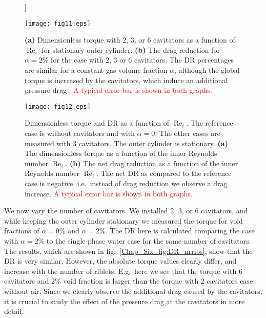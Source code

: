 \documentclass[aps,onecolumn,10pt, floatfix, superscriptaddress,longbibliography, pra]{revtex4-1}
\newcommand{\red}[1]{\textcolor{red}{#1}}
\renewcommand{\Re}{\operatorname{Re}}
\begin{document}
\begin{figure}[htp]
\centering]


\texttt{[image: fig11.eps]}
\caption{{\bf (a)} Dimensionless torque with 2, 3, or 6 cavitators as a function of $\Re_i$ for stationary outer cylinder. {\bf (b)} The drag reduction for $\alpha=2\%$ for the case with 2, 3 or 6 cavitators. The DR percentages are similar for a constant gas volume fraction $\alpha$, although the global torque is increased by the cavitators, which induce an additional pressure drag \citep{zhu18}. \red{A typical error bar is shown in both graphs.} }
\label{Chap_Six_fig:DR_nrribs}

\texttt{[image: fig12.eps]}
\caption{Dimensionless torque and DR as a function of $\Re_i$. The reference case is without cavitators and with $\alpha=0$. The other cases are measured with 3 cavitators. The outer cylinder is stationary. {\bf (a)} The dimensionless torque as a function of the inner Reynolds number $\Re_i$. {\bf (b)} The net drag reduction as a function of the inner Reynolds number $\Re_i$. The net DR as compared to the reference case is negative, i.e.\ instead of drag reduction we observe a drag increase. \red{A typical error bar is shown in both graphs.}}
\label{Chap_Six_fig:DR_net}
\end{figure} 

We now vary the number of cavitators. We installed 2, 3, or 6 cavitators, and while keeping the outer cylinder stationary we measured the torque for void fractions of $\alpha=0\%$ and $\alpha=2\%$. The DR here is calculated comparing the case with $\alpha=2\%$ to the single-phase water case for the same number of cavitators. The results, which are shown in fig.\ \ref{Chap_Six_fig:DR_nrribs}, show that the DR is very similar. However, the absolute torque values  clearly differ, and increase with the number of riblets. E.g.\ here we see that the torque with 6 cavitators and $2\%$ void fraction is larger than the torque with 2 cavitators case without air. Since we clearly observe the additional drag caused by the cavitators, it is crucial to study the effect of the pressure drag at the cavitators in more detail.
\end{document}
